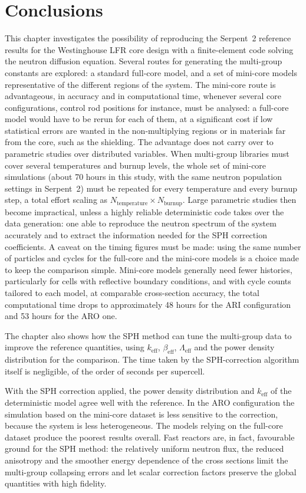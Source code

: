 \section{Conclusions}
This chapter investigates the possibility of reproducing the Serpent~2 reference results for the Westinghouse LFR core design with a finite-element code solving the neutron diffusion equation. Several routes for generating the multi-group constants are explored: a standard full-core model, and a set of mini-core models representative of the different regions of the system. The mini-core route is advantageous, in accuracy and in computational time, whenever several core configurations, control rod positions for instance, must be analysed: a full-core model would have to be rerun for each of them, at a significant cost if low statistical errors are wanted in the non-multiplying regions or in materials far from the core, such as the shielding. The advantage does not carry over to parametric studies over distributed variables. When multi-group libraries must cover several temperatures and burnup levels, the whole set of mini-core simulations (about 70 hours in this study, with the same neutron population settings in Serpent~2) must be repeated for every temperature and every burnup step, a total effort scaling as $N_{\text{temperature}} \times N_{\text{burnup}}$. Large parametric studies then become impractical, unless a highly reliable deterministic code takes over the data generation: one able to reproduce the neutron spectrum of the system accurately and to extract the information needed for the SPH correction coefficients.
A caveat on the timing figures must be made: using the same number of particles and cycles for the full-core and the mini-core models is a choice made to keep the comparison simple. Mini-core models generally need fewer histories, particularly for cells with reflective boundary conditions, and with cycle counts tailored to each model, at comparable cross-section accuracy, the total computational time drops to approximately 48 hours for the ARI configuration and 53 hours for the ARO one.

The chapter also shows how the SPH method can tune the multi-group data to improve the reference quantities, using $k_{\mathrm{eff}}$, $\beta_{\mathrm{eff}}$, $\Lambda_{\mathrm{eff}}$ and the power density distribution for the comparison. The time taken by the SPH-correction algorithm itself is negligible, of the order of seconds per supercell.

With the SPH correction applied, the power density distribution and $k_{\mathrm{eff}}$ of the deterministic model agree well with the reference. In the ARO configuration the simulation based on the mini-core dataset is less sensitive to the correction, because the system is less heterogeneous. The models relying on the full-core dataset produce the poorest results overall. Fast reactors are, in fact, favourable ground for the SPH method: the relatively uniform neutron flux, the reduced anisotropy and the smoother energy dependence of the cross sections limit the multi-group collapsing errors and let scalar correction factors preserve the global quantities with high fidelity.

